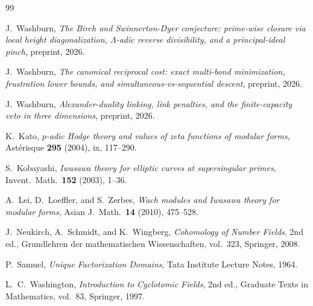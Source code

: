 \documentclass[11pt]{amsart}
\theoremstyle{definition}
\theoremstyle{remark}
\begin{document}
\begin{thebibliography}{99}

J.~Washburn,
\emph{The Birch and Swinnerton-Dyer conjecture: prime-wise closure
via local height diagonalization, $\Lambda$-adic reverse divisibility,
and a principal-ideal pinch},
preprint, 2026.

J.~Washburn,
\emph{The canonical reciprocal cost: exact multi-bond minimization,
frustration lower bounds, and simultaneous-vs-sequential descent},
preprint, 2026.

J.~Washburn,
\emph{Alexander-duality linking, link penalties, and the finite-capacity
veto in three dimensions},
preprint, 2026.

K.~Kato,
\emph{$p$-adic Hodge theory and values of zeta functions
of modular forms},
Ast\'erisque \textbf{295} (2004), ix, 117--290.

S.~Kobayashi,
\emph{Iwasawa theory for elliptic curves at supersingular primes},
Invent.\ Math.\ \textbf{152} (2003), 1--36.

A.~Lei, D.~Loeffler, and S.~Zerbes,
\emph{Wach modules and Iwasawa theory for modular forms},
Asian J.\ Math.\ \textbf{14} (2010), 475--528.

J.~Neukirch, A.~Schmidt, and K.~Wingberg,
\emph{Cohomology of Number Fields},
2nd ed., Grundlehren der mathematischen Wissenschaften, vol.~323,
Springer, 2008.

P.~Samuel,
\emph{Unique Factorization Domains},
Tata Institute Lecture Notes, 1964.

L.~C.~Washington,
\emph{Introduction to Cyclotomic Fields},
2nd ed., Graduate Texts in Mathematics, vol.~83, Springer, 1997.

\end{thebibliography}
\end{document}
